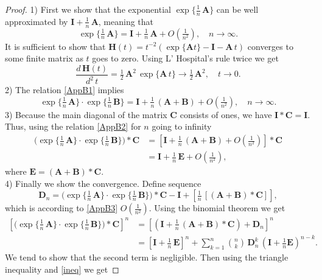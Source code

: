 \begin{appendices}
\begin{proof}
1) First we show that the exponential $\exp\{\tfrac{1}{n}\,\bm{A}\}$ can be well approximated by $\bm{I}+\tfrac{1}{n}\,\bm{A}$, meaning that
\begin{equation}
\label{AppB1}
\exp\{\tfrac{1}{n}\,\bm{A}\}=\bm{I}+\tfrac{1}{n}\,\bm{A}+O\left(\tfrac{1}{n^2}\right), \quad n\longrightarrow\infty.
\end{equation}
It is sufficient to show that $\bm{H}(t)=t^{-2}(\exp\{\bm{A}t\}-\bm{I}-\bm{A}\,t)$ converges to some finite matrix as $t$ goes to zero. Using L' Hospital's rule twice we get
$$\frac{d\,\bm{H}(t)}{d^2\,t}=\tfrac{1}{2}\,\bm{A}^2\,\exp\{\bm{A}\,t\}\longrightarrow\tfrac{1}{2}\,\bm{A}^2, \quad t\longrightarrow 0.$$
2) The relation \eqref{AppB1} implies
\begin{equation}
\label{AppB2}
\exp\{\tfrac{1}{n}\,\bm{A}\}\cdot\exp\{\tfrac{1}{n}\,\bm{B}\}=\bm{I}+\tfrac{1}{n}\,(\bm{A}+\bm{B})+O\left(\tfrac{1}{n^2}\right), \quad n\longrightarrow\infty.
\end{equation}
3) Because the main diagonal of the matrix $\bm{C}$ consists of ones, we have $\bm{I}\ast\bm{C}=\bm{I}$. Thus, using the relation \eqref{AppB2} for $n$ going to infinity
\begin{equation}
\label{AppB3}
\begin{split}
\big(\exp\{\tfrac{1}{n}\,\bm{A}\}\cdot \exp\{\tfrac{1}{n}\,\bm{B}\}\big)\ast \bm{C}&=\left[\bm{I}+\tfrac{1}{n}\,(\bm{A}+\bm{B})+O\left(\tfrac{1}{n^2}\right)\right]\ast\bm{C}\\
&=\bm{I}+\tfrac{1}{n}\,\bm{E}+O\left(\tfrac{1}{n^2}\right),
\end{split}
\end{equation}
where $\bm{E}=(\bm{A}+\bm{B})\ast\bm{C}$.\\
4) Finally we show the convergence. Define sequence
\[ \bm{D}_n=\big(\exp\{\tfrac{1}{n}\,\bm{A}\}\cdot \exp\{\tfrac{1}{n}\,\bm{B}\}\big)\ast \bm{C}-\bm{I}+[\tfrac{1}{n}\,[(\bm{A}+\bm{B})\ast\bm{C}]], \]
which is according to \eqref{AppB3} $O\left(\tfrac{1}{n^2}\right)$. Using the binomial theorem we get 
\begin{align*}
\left[\big(\exp\{\tfrac{1}{n}\,\bm{A}\}\cdot\exp\{\tfrac{1}{n}\,\bm{B}\}\big)\ast \bm{C}\right]^n&=[(\bm{I}+\tfrac{1}{n}\,(\bm{A}+\bm{B})\ast\bm{C})+\bm{D}_n]^n\\
&=\left[\bm{I}+\tfrac{1}{n}\,\bm{E}\right]^n+\sum_{k=1}^n {{n}\choose{k}}\,\bm{D}_n^k\,\left(\bm{I}+\tfrac{1}{n}\bm{E}\right)^{n-k}.
\end{align*}
We tend to show that the second term is negligible. 
Then using the triangle inequality and \eqref{ineq} we get

\end{proof}
\end{appendices}

